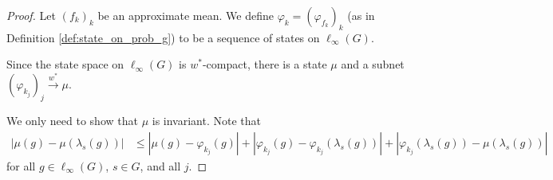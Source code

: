 \documentclass[10pt]{mypackage2}
\begin{document}
\begin{proof}
  Let $\left(f_k\right)_k$ be an approximate mean. We define $\varphi_k = \left(\varphi_{f_k}\right)_k$ (as in Definition \ref{def:state_on_prob_g}) to be a sequence of states on $\ell_{\infty}\left(G\right)$.\newline

  Since the state space on $\ell_{\infty}\left(G\right)$ is $w^{\ast}$-compact, there is a state $\mu$ and a subnet $\left(\varphi_{k_j}\right)_j \xrightarrow{w^{\ast}}\mu$. \newline

  We only need to show that $\mu$ is invariant. Note that
  \begin{align*}
    \left\vert \mu\left(g\right) - \mu\left(\lambda_s\left(g\right)\right) \right\vert &\leq \left\vert \mu\left(g\right) - \varphi_{k_j}\left(g\right) \right\vert + \left\vert \varphi_{k_j}\left(g\right) - \varphi_{k_j}\left(\lambda_s\left(g\right)\right) \right\vert + \left\vert \varphi_{k_j}\left(\lambda_s\left(g\right)\right) - \mu\left(\lambda_s\left(g\right)\right) \right\vert
  \end{align*}
  for all $g\in \ell_{\infty}\left(G\right)$, $s\in G$, and all $j$.\newline


\end{proof}
\end{document}
